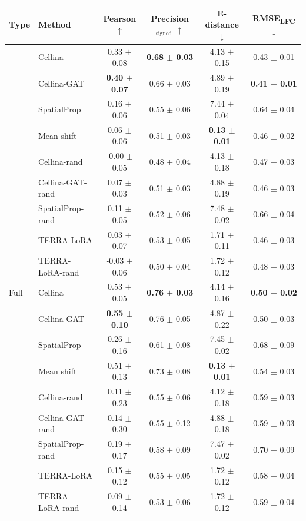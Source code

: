 \begin{tabular}{llcccc}
\toprule
Type & Method & Pearson $\uparrow$ & Precision$_{\mathrm{signed}}$ $\uparrow$ & E-distance $\downarrow$ & RMSE\textsubscript{LFC} $\downarrow$ \\
\midrule
{}
& Cellina & 0.33 $\pm$ 0.08 & \textbf{0.68 $\pm$ 0.03} & 4.13 $\pm$ 0.15 & 0.43 $\pm$ 0.01 \\
& Cellina-GAT & \textbf{0.40 $\pm$ 0.07} & 0.66 $\pm$ 0.03 & 4.89 $\pm$ 0.19 & \textbf{0.41 $\pm$ 0.01} \\
& SpatialProp & 0.16 $\pm$ 0.06 & 0.55 $\pm$ 0.06 & 7.44 $\pm$ 0.04 & 0.64 $\pm$ 0.04 \\
& Mean shift & 0.06 $\pm$ 0.06 & 0.51 $\pm$ 0.03 & \textbf{0.13 $\pm$ 0.01} & 0.46 $\pm$ 0.02 \\
& Cellina-rand & -0.00 $\pm$ 0.05 & 0.48 $\pm$ 0.04 & 4.13 $\pm$ 0.18 & 0.47 $\pm$ 0.03 \\
& Cellina-GAT-rand & 0.07 $\pm$ 0.03 & 0.51 $\pm$ 0.03 & 4.88 $\pm$ 0.19 & 0.46 $\pm$ 0.03 \\
& SpatialProp-rand & 0.11 $\pm$ 0.05 & 0.52 $\pm$ 0.06 & 7.48 $\pm$ 0.02 & 0.66 $\pm$ 0.04 \\
& TERRA-LoRA & 0.03 $\pm$ 0.07 & 0.53 $\pm$ 0.05 & 1.71 $\pm$ 0.11 & 0.46 $\pm$ 0.03 \\
& TERRA-LoRA-rand & -0.03 $\pm$ 0.06 & 0.50 $\pm$ 0.04 & 1.72 $\pm$ 0.12 & 0.48 $\pm$ 0.03 \\
\midrule
Full
& Cellina & 0.53 $\pm$ 0.05 & \textbf{0.76 $\pm$ 0.03} & 4.14 $\pm$ 0.16 & \textbf{0.50 $\pm$ 0.02} \\
& Cellina-GAT & \textbf{0.55 $\pm$ 0.10} & 0.76 $\pm$ 0.05 & 4.87 $\pm$ 0.22 & 0.50 $\pm$ 0.03 \\
& SpatialProp & 0.26 $\pm$ 0.16 & 0.61 $\pm$ 0.08 & 7.45 $\pm$ 0.02 & 0.68 $\pm$ 0.09 \\
& Mean shift & 0.51 $\pm$ 0.13 & 0.73 $\pm$ 0.08 & \textbf{0.13 $\pm$ 0.01} & 0.54 $\pm$ 0.03 \\
& Cellina-rand & 0.11 $\pm$ 0.23 & 0.55 $\pm$ 0.06 & 4.12 $\pm$ 0.18 & 0.59 $\pm$ 0.03 \\
& Cellina-GAT-rand & 0.14 $\pm$ 0.30 & 0.55 $\pm$ 0.12 & 4.88 $\pm$ 0.18 & 0.59 $\pm$ 0.03 \\
& SpatialProp-rand & 0.19 $\pm$ 0.17 & 0.58 $\pm$ 0.09 & 7.47 $\pm$ 0.02 & 0.70 $\pm$ 0.09 \\
& TERRA-LoRA & 0.15 $\pm$ 0.12 & 0.55 $\pm$ 0.05 & 1.72 $\pm$ 0.12 & 0.58 $\pm$ 0.04 \\
& TERRA-LoRA-rand & 0.09 $\pm$ 0.14 & 0.53 $\pm$ 0.06 & 1.72 $\pm$ 0.12 & 0.59 $\pm$ 0.04 \\
\bottomrule
\end{tabular}
